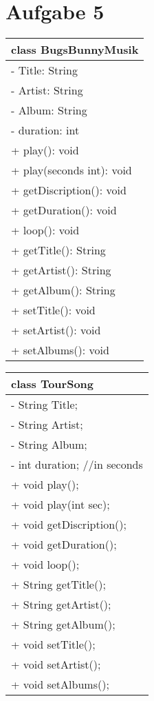 \documentclass{scrartcl}
\begin{document}
\section*{Aufgabe 5}
\begin{tabular}{|p{}|}
\hline
	class BugsBunnyMusik\\
\hline
	- Title: String\\
	- Artist: String\\
	- Album: String\\
	- duration: int\\
\hline
	+ play(): void\\
	+ play(seconds int): void\\
	+ getDiscription(): void\\
	+ getDuration(): void\\
	+ loop(): void\\
	+ getTitle(): String\\
	+ getArtist(): String\\
	+ getAlbum(): String\\
	+ setTitle(): void\\
	+ setArtist(): void\\
	+ setAlbums(): void\\
\hline
\end{tabular}
\begin{tabular}{|p{}|}
\hline
	class TourSong\\
\hline
	- String Title;\\
	- String Artist;\\
	- String Album;\\
	- int duration; //in seconds\\
\hline
	+ void play();\\
	+ void play(int sec);\\
	+ void getDiscription();\\
	+ void getDuration();\\
	+ void loop();\\
	+ String getTitle();\\
	+ String getArtist();\\
	+ String getAlbum();\\
	+ void setTitle();\\
	+ void setArtist();\\
	+ void setAlbums();\\
\hline
\end{tabular}
\end{document}
